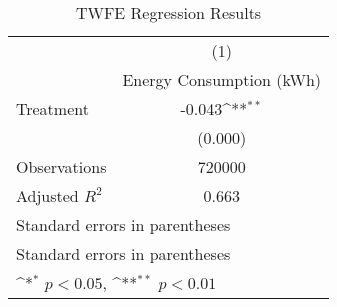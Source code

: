 \begin{table}[htbp]\centering
\def\sym#1{\ifmmode^{#1}\else\(^{#1}\)\fi}
\caption{TWFE Regression Results}
\begin{tabular}{l*{1}{c}}
\hline\hline
                    &\multicolumn{1}{c}{(1)}\\
                    &\multicolumn{1}{c}{Energy Consumption (kWh)}\\
\hline
Treatment           &      -0.043\sym{**}\\
                    &     (0.000)        \\
\hline
Observations        &      720000        \\
Adjusted \(R^{2}\)  &       0.663        \\
\hline\hline
\multicolumn{2}{l}{\footnotesize Standard errors in parentheses}\\
\multicolumn{2}{l}{\footnotesize Standard errors in parentheses}\\
\multicolumn{2}{l}{\footnotesize \sym{*} \(p<0.05\), \sym{**} \(p<0.01\)}\\
\end{tabular}
\end{table}
